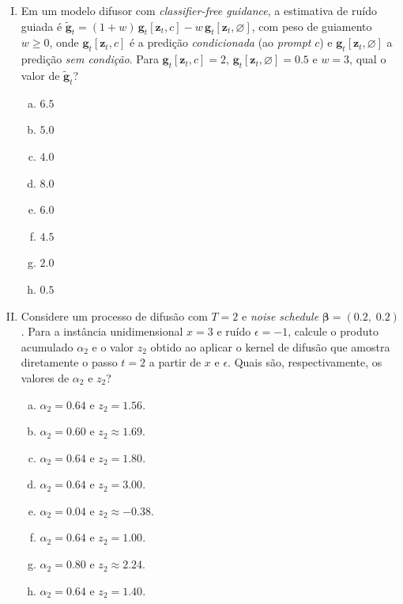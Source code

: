 \documentclass{dlproblemset}
\begin{document}
\begin{enumerate}[I)]
\item Em um modelo difusor com \textit{classifier-free guidance}, a estimativa de ruído guiada é $\tilde{\mathbf{g}}_t = (1 + w)\,\mathbf{g}_t[\mathbf{z}_t, c] - w\,\mathbf{g}_t[\mathbf{z}_t, \varnothing]$, com peso de guiamento $w \ge 0$, onde $\mathbf{g}_t[\mathbf{z}_t, c]$ é a predição \emph{condicionada} (ao \textit{prompt} $c$) e $\mathbf{g}_t[\mathbf{z}_t, \varnothing]$ a predição \emph{sem condição}. Para $\mathbf{g}_t[\mathbf{z}_t, c] = 2$, $\mathbf{g}_t[\mathbf{z}_t, \varnothing] = 0.5$ e $w = 3$, qual o valor de $\tilde{\mathbf{g}}_t$?
\begin{enumerate}[(a)]
    \item $6.5$
    \item $5.0$
    \item $4.0$
    \item $8.0$
    \item $6.0$
    \item $4.5$
    \item $2.0$
    \item $0.5$
\end{enumerate}

\item Considere um processo de difusão com $T = 2$ e \textit{noise schedule} $\boldsymbol{\beta} = (0.2,\; 0.2)$. Para a instância unidimensional $x = 3$ e ruído $\epsilon = -1$, calcule o produto acumulado $\alpha_2$ e o valor $z_2$ obtido ao aplicar o kernel de difusão que amostra diretamente o passo $t = 2$ a partir de $x$ e $\epsilon$. Quais são, respectivamente, os valores de $\alpha_2$ e $z_2$?
\begin{enumerate}[(a)]
    \item $\alpha_2 = 0.64$ e $z_2 = 1.56$.
    \item $\alpha_2 = 0.60$ e $z_2 \approx 1.69$.
    \item $\alpha_2 = 0.64$ e $z_2 = 1.80$.
    \item $\alpha_2 = 0.64$ e $z_2 = 3.00$.
    \item $\alpha_2 = 0.04$ e $z_2 \approx -0.38$.
    \item $\alpha_2 = 0.64$ e $z_2 = 1.00$.
    \item $\alpha_2 = 0.80$ e $z_2 \approx 2.24$.
    \item $\alpha_2 = 0.64$ e $z_2 = 1.40$.
\end{enumerate}


\end{enumerate}
\end{document}
